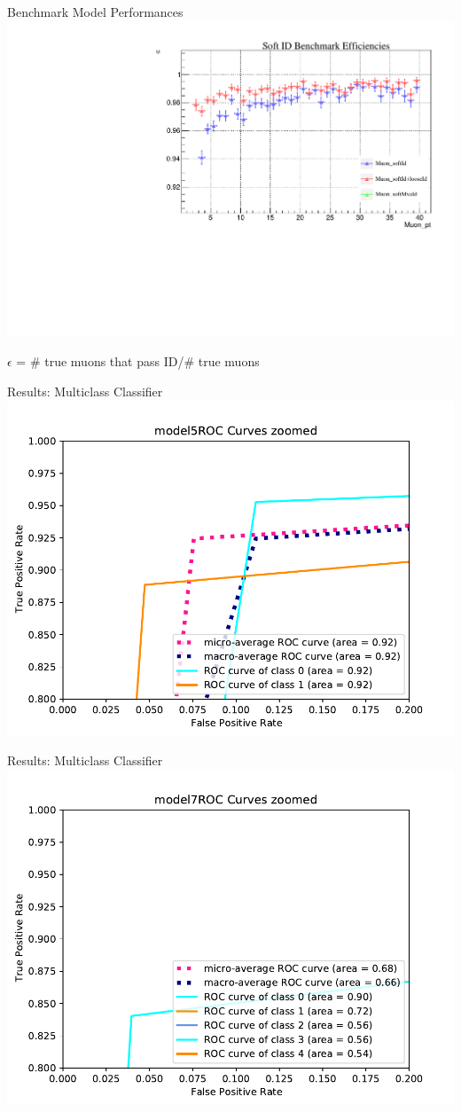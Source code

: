 \documentclass[10pt,handout]{beamer}
\begin{document}
\begin{frame}{Benchmark Model Performances}
\centering
\includegraphics[scale=.5]{benchmarkEfficiency_TTjetszoomed.pdf}

$\epsilon$ = \# true muons that pass ID/\# true muons
\end{frame}

\begin{frame}{Results: Multiclass Classifier}
\centering
\includegraphics[scale=0.6]{model5_ROCcurveszoom.pdf}
\end{frame}

\begin{frame}{Results: Multiclass Classifier}
\centering
\includegraphics[scale=0.6]{model7_ROCcurveszoom.pdf}
\end{frame}
\end{document}
